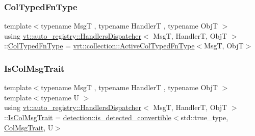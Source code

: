 \subsubsection{\texorpdfstring{Col\+Typed\+Fn\+Type}{ColTypedFnType}}
{\footnotesize\ttfamily template$<$typename MsgT , typename HandlerT , typename ObjT $>$ \\
using \hyperlink{structvt_1_1auto__registry_1_1_handlers_dispatcher}{vt\+::auto\+\_\+registry\+::\+Handlers\+Dispatcher}$<$ MsgT, HandlerT, ObjT $>$\+::\hyperlink{structvt_1_1auto__registry_1_1_handlers_dispatcher_ad45c828eebdd2a18ffc0aa64f542a85c}{Col\+Typed\+Fn\+Type} =  \hyperlink{namespacevt_1_1vrt_1_1collection_a939327f58a5838cf9d7dcc7f14d1670c}{vrt\+::collection\+::\+Active\+Col\+Typed\+Fn\+Type}$<$MsgT, ObjT$>$}

\mbox{\label{structvt_1_1auto__registry_1_1_handlers_dispatcher_a585421b015b2d94915817c509e38b073}} 
\subsubsection{\texorpdfstring{Is\+Col\+Msg\+Trait}{IsColMsgTrait}}
{\footnotesize\ttfamily template$<$typename MsgT , typename HandlerT , typename ObjT $>$ \\
template$<$typename U $>$ \\
using \hyperlink{structvt_1_1auto__registry_1_1_handlers_dispatcher}{vt\+::auto\+\_\+registry\+::\+Handlers\+Dispatcher}$<$ MsgT, HandlerT, ObjT $>$\+::\hyperlink{structvt_1_1auto__registry_1_1_handlers_dispatcher_a585421b015b2d94915817c509e38b073}{Is\+Col\+Msg\+Trait} =  \hyperlink{namespacedetection_afb970b23e39cfecb33449d40242c49ff}{detection\+::is\+\_\+detected\+\_\+convertible}$<$std\+::true\+\_\+type, \hyperlink{structvt_1_1auto__registry_1_1_handlers_dispatcher_aa2e8b80baa4dffdd9b2476ca9d2a7b46}{Col\+Msg\+Trait}, U$>$}

\mbox{\label{structvt_1_1auto__registry_1_1_handlers_dispatcher_aa5e51c30b4d5124a98d04bdc2be043ac}} 
